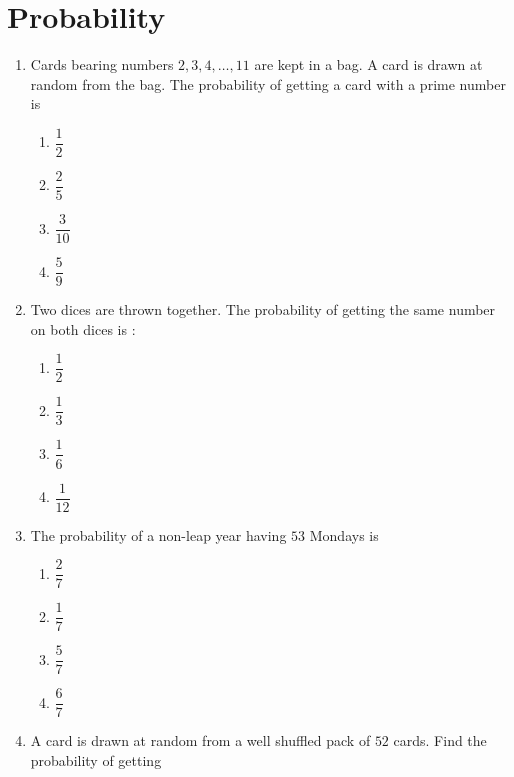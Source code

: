 \documentclass[journal,12pt,onecolumn]{IEEEtran}
\theoremstyle{remark}
\begin{document}
\section{Probability}
\begin{enumerate}
\item Cards bearing numbers $2, 3, 4, \ldots, 11$ are kept in a bag. A card is drawn at random from the bag. The probability of getting a card with a prime number is\\
\begin{enumerate}
\item $\dfrac{1}{2}$\\
\item $\dfrac{2}{5}$\\
\item $\dfrac{3}{10}$\\
\item $\dfrac{5}{9}$\\
\end{enumerate}
\item Two dices are thrown together. The probability of getting the same number on both dices is :\\
\begin{enumerate}
\item $\dfrac{1}{2}$\\
\item $\dfrac{1}{3}$\\
\item $\dfrac{1}{6}$\\
\item $\dfrac{1}{12}$\\
\end{enumerate}
\item The probability of a non-leap year having $53$ Mondays is \\
\begin{enumerate}
\item $\dfrac{2}{7}$\\
\item $\dfrac{1}{7}$\\
\item $\dfrac{5}{7}$\\
\item $\dfrac{6}{7}$\\
\end{enumerate}
\item A card is drawn at random from a well shuffled pack of $52$ cards. Find the probability of getting\\
\begin{enumerate}[label=\Roman*.]

\end{enumerate}
\end{enumerate}
\end{document}
